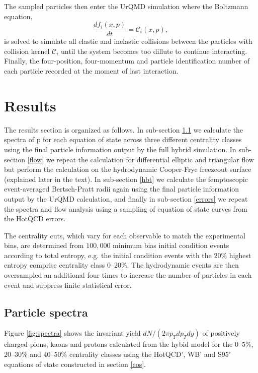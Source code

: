 \documentclass[aps,prc,reprint,amsmath,nofootinbib,superscriptaddress]{revtex4-1}
\begin{document}
The sampled particles then enter the UrQMD simulation where the Boltzmann equation, 
\begin{equation}
 \frac{df_i(x,p)}{dt} = \mathcal{C}_i(x,p),
\end{equation}
is solved to simulate all elastic and inelastic collisions between the particles with collision kernel $\mathcal{C}_i$ until the system becomes too dillute to continue interacting. 
Finally, the four-position, four-momentum and particle identification number of each particle recorded at the moment of last interaction. 
 
\section{Results}

The results section is organized as follows. In sub-section \ref{spectra} we calculate the spectra of p for each equation of state across three different centrality classes using the final 
particle information output by the full hybrid simulation. In sub-section \ref{flow} we repeat the calculation for differential elliptic and triangular flow but perform the calculation 
on the hydrodynamic Cooper-Frye freezeout surface (explained later in the text). In sub-section \ref{hbt} we calculate the femptoscopic event-averaged Bertsch-Pratt radii again using the
final particle information output by the UrQMD calculation, and finally in sub-section \ref{errors} we repeat the spectra and flow analysis using a sampling of equation of state curves
from the HotQCD errors. 

The centrality cuts, which vary for each observable to match the experimental bins, are determined from $100,000$ minimum bias initial condition events according to
total entropy, e.g. the initial condition events with the $20\%$ highest entropy comprise centrality class $0$--$20\%$. The hydrodynamic events are then oversampled an additional
four times to increase the number of particles in each event and suppress finite statistical error.

\subsection{Particle spectra}
\label{spectra}

Figure \ref{fig:spectra} shows the invariant yield $dN/(2\pi p_T dp_T dy)$ of positively charged pions, kaons and protons calculated from the hybid model for the $0$--$5\%$, $20$--$30\%$
and $40$--$50\%$ centrality classes using the HotQCD', WB' and S95' equations of state constructed in section \ref{eos}. 
\end{document}
